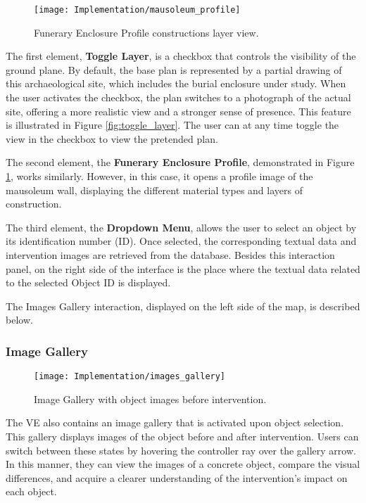  \begin{figure}[h!]
    \centering
    \texttt{[image: Implementation/mausoleum\_profile]}
    \caption{Funerary Enclosure Profile constructions layer view.}
    \label{fig:mausoleum_profile}    
\end{figure}

The first element, \textbf{Toggle Layer}, is a checkbox that controls the visibility of the ground plane.
By default, the base plan is represented by a partial drawing of this archaeological site, which includes the burial enclosure under study. 
When the user activates the checkbox, the plan switches to a photograph of the actual site, offering a more realistic view and a stronger sense of presence. 
This feature is illustrated in Figure \ref{fig:toggle_layer}.
The user can at any time toggle the view in the checkbox to view the pretended plan.

The second element, the \textbf{Funerary Enclosure Profile}, demonstrated in Figure \ref{fig:mausoleum_profile}, works similarly. However, in this case, it opens a profile image of the mausoleum wall, displaying the different material types and layers of construction.

The third element, the \textbf{Dropdown Menu}, allows the user to select an object by its identification number (ID).
Once selected, the corresponding textual data and intervention images are retrieved from the database.
Besides this interaction panel, on the right side of the interface is the place where the textual data related to the selected Object ID is displayed.

The Images Gallery interaction, displayed on the left side of the map, is described below.

\subsubsection{Image Gallery}
\label{sec:image_gallery}

\begin{figure}[h!]
    \centering
    \texttt{[image: Implementation/images\_gallery]}
    \caption{Image Gallery with object images before intervention.}
    \label{fig:image_gallery}
\end{figure}

The \gls{VE} also contains an image gallery that is activated upon object selection. 
This gallery displays images of the object before and after intervention. 
Users can switch between these states by hovering the controller ray over the gallery arrow. 
In this manner, they can view the images of a concrete object, compare the visual differences, and acquire a clearer understanding of the intervention's impact on each object.

